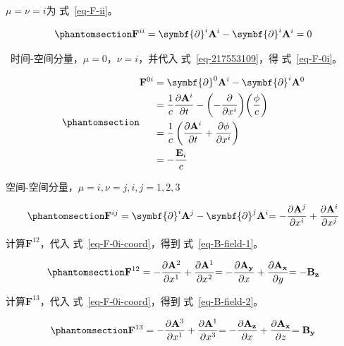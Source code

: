 \documentclass[
  chinese,
  a4paper,
  UTF8,
  12pt,
  oneside,
  openany]{ctexbook}
\begin{document}
\(\mu = \nu = i\)为 式~\ref{eq-F-ii}。

\begin{equation}\protect\phantomsection\label{eq-F-ii}{
\mathbf{F}^{ii} = \symbf{\partial}^{i}\mathbf{A}^{i} - \symbf{\partial}^{i}\mathbf{A}^{i} = 0
}\end{equation}

~时间-空间分量，\(\mu = 0\)，\(\nu = i\)，并代入
式~\ref{eq-217553109}，得 式~\ref{eq-F-0i}。

\begin{equation}\protect\phantomsection\label{eq-F-0i}{
\begin{aligned}
\mathbf{F}^{0i}
&= \symbf{\partial}^{0}\mathbf{A}^{i} - \symbf{\partial}^{i}\mathbf{A}^{0} \\
&= \frac{1}{c}\frac{\partial\mathbf{A}^{i}}{\partial t}
- \biggl(-\frac{\partial}{\partial x^{i}}\biggr)\biggl( \frac{\phi}{c} \biggr) \\
&= \frac{1}{c}\left( \frac{\partial\mathbf{A}^{i}}{\partial t}
+ \frac{\partial\phi}{\partial x^{i}} \right) \\
&= -\frac{\mathbf{E}_{i}}{c}
\end{aligned}
}\end{equation}

空间-空间分量，\(\mu = i,\nu = j,i,j = 1,2,3\)

\begin{equation}\protect\phantomsection\label{eq-F-0i-coord}{
{\mathbf{F}^{ij} = \symbf{\partial}^{i}\mathbf{A}^{j} - \symbf{\partial}^{j}\mathbf{A}^{i}
  }{= - \frac{\partial\mathbf{A}^{j}}{\partial x^{i}} + \frac{\partial\mathbf{A}^{i}}{\partial x^{j}}}
}\end{equation}

计算\(\mathbf{F}^{12}\)，代入 式~\ref{eq-F-0i-coord}，得到
式~\ref{eq-B-field-1}。

\begin{equation}\protect\phantomsection\label{eq-B-field-1}{
{\mathbf{F}^{12} = - \frac{\partial\mathbf{A}^{2}}{\partial x^{1}} + \frac{\partial\mathbf{A}^{1}}{\partial x^{2}}
  }{= - \frac{\partial\mathbf{A}_{\mathbf{y}}}{\partial x} + \frac{\partial\mathbf{A}_{\mathbf{x}}}{\partial y}
  }{= - \mathbf{B}_{\mathbf{z}}}
}\end{equation}

计算\(\mathbf{F}^{13}\)，代入 式~\ref{eq-F-0i-coord}，得到
式~\ref{eq-B-field-2}。

\begin{equation}\protect\phantomsection\label{eq-B-field-2}{
{\mathbf{F}^{13} = - \frac{\partial\mathbf{A}^{3}}{\partial x^{1}} + \frac{\partial\mathbf{A}^{1}}{\partial x^{3}}
  }{= - \frac{\partial\mathbf{A}_{\mathbf{z}}}{\partial x} + \frac{\partial\mathbf{A}_{\mathbf{x}}}{\partial z}
  }{= \mathbf{B}_{\mathbf{y}}}
}\end{equation}
\end{document}
